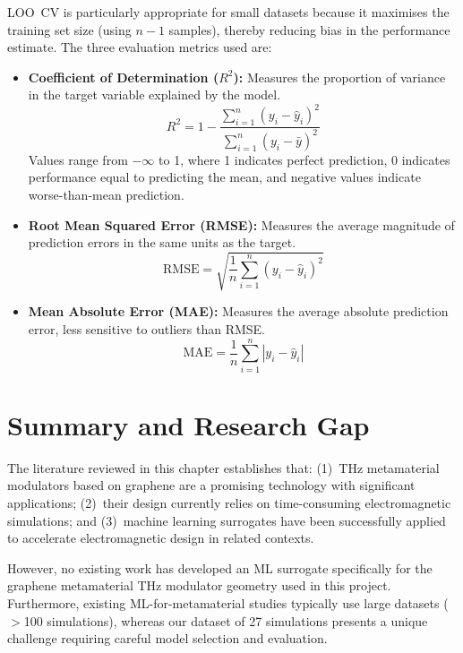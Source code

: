 \documentclass[12pt,a4paper]{report}
\begin{document}
LOO~CV is particularly appropriate for small datasets because it maximises the training set size (using $n-1$ samples), thereby reducing bias in the performance estimate. The three evaluation metrics used are:

\begin{itemize}[leftmargin=2cm]
    \item \textbf{Coefficient of Determination ($R^2$):} Measures the proportion of variance in the target variable explained by the model.
    \begin{equation}
        R^2 = 1 - \frac{\sum_{i=1}^{n}(y_i - \hat{y}_i)^2}{\sum_{i=1}^{n}(y_i - \bar{y})^2}
        \label{eq:r2}
    \end{equation}
    Values range from $-\infty$ to 1, where 1 indicates perfect prediction, 0 indicates performance equal to predicting the mean, and negative values indicate worse-than-mean prediction.

    \item \textbf{Root Mean Squared Error (RMSE):} Measures the average magnitude of prediction errors in the same units as the target.
    \begin{equation}
        \text{RMSE} = \sqrt{\frac{1}{n}\sum_{i=1}^{n}(y_i - \hat{y}_i)^2}
        \label{eq:rmse}
    \end{equation}

    \item \textbf{Mean Absolute Error (MAE):} Measures the average absolute prediction error, less sensitive to outliers than RMSE.
    \begin{equation}
        \text{MAE} = \frac{1}{n}\sum_{i=1}^{n}|y_i - \hat{y}_i|
        \label{eq:mae}
    \end{equation}
\end{itemize}

\section{Summary and Research Gap}
\label{sec:research_gap}

The literature reviewed in this chapter establishes that: (1)~THz metamaterial modulators based on graphene are a promising technology with significant applications; (2)~their design currently relies on time-consuming electromagnetic simulations; and (3)~machine learning surrogates have been successfully applied to accelerate electromagnetic design in related contexts.

However, no existing work has developed an ML surrogate specifically for the graphene metamaterial THz modulator geometry used in this project. Furthermore, existing ML-for-metamaterial studies typically use large datasets ($>$100 simulations), whereas our dataset of 27 simulations presents a unique challenge requiring careful model selection and evaluation.
\end{document}
